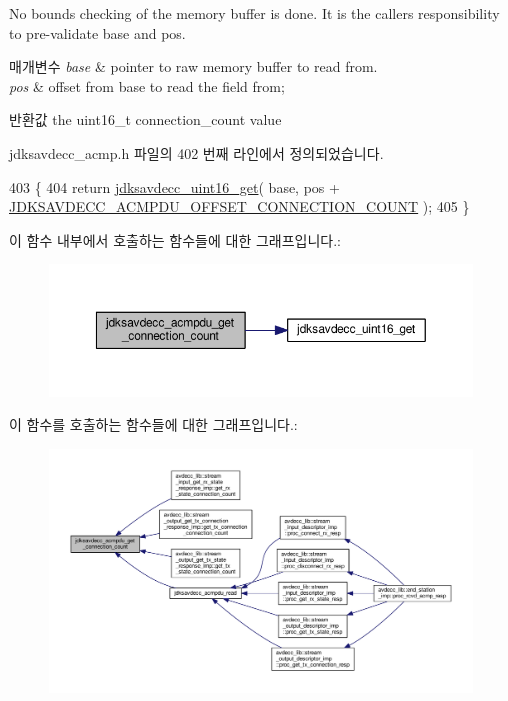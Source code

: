 No bounds checking of the memory buffer is done. It is the caller\textquotesingle{}s responsibility to pre-\/validate base and pos.


\begin{DoxyParams}{매개변수}
{\em base} & pointer to raw memory buffer to read from. \\
\hline
{\em pos} & offset from base to read the field from; \\
\hline
\end{DoxyParams}
\begin{DoxyReturn}{반환값}
the uint16\+\_\+t connection\+\_\+count value 
\end{DoxyReturn}


jdksavdecc\+\_\+acmp.\+h 파일의 402 번째 라인에서 정의되었습니다.


\begin{DoxyCode}
403 \{
404     \textcolor{keywordflow}{return} \hyperlink{group__endian_ga3fbbbc20be954aa61e039872965b0dc9}{jdksavdecc\_uint16\_get}( base, pos + 
      \hyperlink{group__acmpdu_ga7adf002f51ba693e4be28ac84f5a93f3}{JDKSAVDECC\_ACMPDU\_OFFSET\_CONNECTION\_COUNT} );
405 \}
\end{DoxyCode}


이 함수 내부에서 호출하는 함수들에 대한 그래프입니다.\+:
\nopagebreak
\begin{figure}[H]
\begin{center}
\leavevmode
\includegraphics[width=350pt]{group__acmpdu_ga28f4116aa95376ec5378febf22e830b5_cgraph}
\end{center}
\end{figure}




이 함수를 호출하는 함수들에 대한 그래프입니다.\+:
\nopagebreak
\begin{figure}[H]
\begin{center}
\leavevmode
\includegraphics[width=350pt]{group__acmpdu_ga28f4116aa95376ec5378febf22e830b5_icgraph}
\end{center}
\end{figure}


